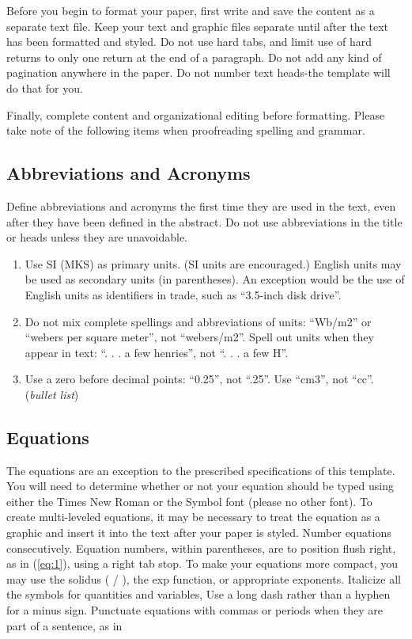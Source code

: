 \documentclass{article} %
\begin{document}
\begin{multicols}{2}
Before you begin to format your paper, first write and save the content as a separate text file. Keep your text and graphic files separate until after the text has been formatted and styled. Do not use hard tabs, and limit use of hard returns to only one return at the end of a paragraph. Do not add any kind of pagination anywhere in the paper. Do not number text heads-the template will do that for you.

Finally, complete content and organizational editing before formatting. Please take note of the following items when proofreading spelling and grammar.


\subsection{Abbreviations and Acronyms}

Define abbreviations and acronyms the first time they are used in the text, even after they have been defined in the abstract. Do not use abbreviations in the title or heads unless they are unavoidable.



\begin{enumerate}
\item \textit{ }Use SI (MKS) as primary units. (SI units are encouraged.) English units may be used as secondary units (in parentheses). An exception would be the use of English units as identifiers in trade, such as ``3.5-inch disk drive''.

\item  Do not mix complete spellings and abbreviations of units: ``Wb/m2'' or ``webers per square meter'', not ``webers/m2''.  Spell out units when they appear in text: ``. . . a few henries'', not ``. . . a few H''.

\item  Use a zero before decimal points: ``0.25'', not ``.25''. Use ``cm3'', not ``cc''. (\textit{bullet list})
\end{enumerate}


\subsection{Equations}

The equations are an exception to the prescribed specifications of this template. You will need to determine whether or not your equation should be typed using either the Times New Roman or the Symbol font (please no other font). To create multi-leveled equations, it may be necessary to treat the equation as a graphic and insert it into the text after your paper is styled.
Number equations consecutively. Equation numbers, within parentheses, are to position flush right, as in (\ref{eq:1}), using a right tab stop. To make your equations more compact, you may use the solidus ( / ), the exp function, or appropriate exponents. Italicize all the symbols for quantities and variables, Use a long dash rather than a hyphen for a minus sign. Punctuate equations with commas or periods when they are part of a sentence, as in


\end{multicols}
\end{document}
